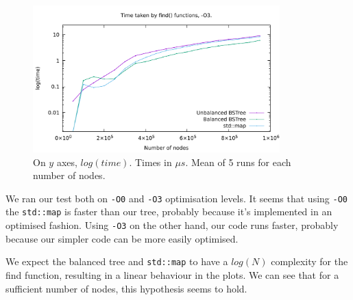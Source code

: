 \documentclass[12pt,a4paper,openany]{scrartcl}
\begin{document}
    \begin{figure}[H]
        \centering
        \captionsetup{format=plain}
        \caption{On $y$ axes, $log(time)$. Times in $\mu s$. Mean of 5 runs for each number of nodes.}
        \label{fig:O3}
        \includegraphics[width=0.85\textwidth]{img/plotO3.pdf}
    \end{figure}
    
    	
	We ran our test both on \texttt{-O0} and \texttt{-O3} optimisation levels. It seems that using \texttt{-O0} the \texttt{std::map} is faster than our tree, probably because it's implemented in an optimised fashion. Using \texttt{-O3} on the other hand, our code runs faster, probably because our simpler code can be more easily optimised.
	
	We expect the balanced tree and \texttt{std::map} to have a $log(N)$ complexity for the find function, resulting in a linear behaviour in the plots. We can see that for a sufficient number of nodes, this hypothesis seems to hold. 
	
\end{document}
